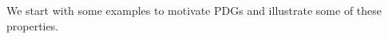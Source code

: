 \documentclass{article}
\theoremstyle{plain}
\theoremstyle{definition}
\theoremstyle{remark}
\numberwithin{equation}{section}
\begin{document}
We start with some examples to motivate PDGs and illustrate some
        of these properties.  
\end{document}
